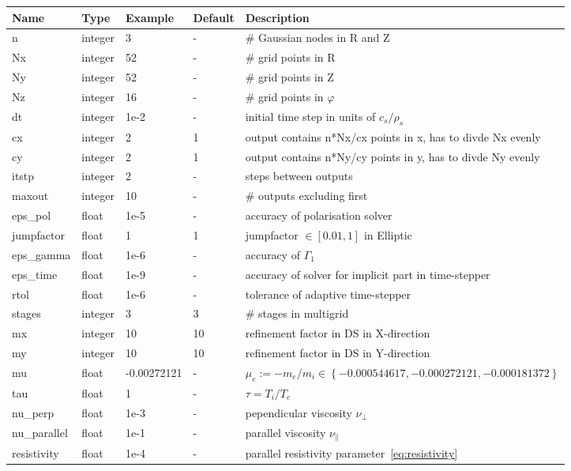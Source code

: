 \begin{longtable}{llll>{\RaggedRight}p{7cm}}
\toprule
\rowcolor{gray!50}\textbf{Name} &  \textbf{Type} & \textbf{Example} & \textbf{Default} & \textbf{Description}  \\ \midrule
n      & integer & 3 & - &\# Gaussian nodes in R and Z \\
Nx     & integer &52& - &\# grid points in R \\
Ny     & integer &52& - &\# grid points in Z \\
Nz     & integer &16& - &\# grid points in $\varphi$ \\
dt     & integer &1e-2& - &initial time step in units of $c_s/\rho_s$ \\
cx & integer & 2 & 1 & output contains n*Nx/cx points in x,
    has to divde Nx evenly\\
cy & integer & 2 & 1 & output contains n*Ny/cy points in y,
    has to divde Ny evenly\\
itstp       & integer & 2  & - & steps between outputs \\
maxout      & integer & 10 & - & \# outputs excluding first \\
eps\_pol    & float & 1e-5  & - &  accuracy of polarisation solver \\
jumpfactor  & float & 1 & 1 &   jumpfactor $\in \left[0.01,1\right]$ in Elliptic\\
eps\_gamma  & float & 1e-6  & - & accuracy of $\Gamma_1$  \\
eps\_time   & float & 1e-9  & - & accuracy of solver for implicit part in time-stepper \\
rtol  & float &1e-6   & - &tolerance of adaptive time-stepper \\
stages      & integer & 3 & 3 & \# stages in multigrid  \\
mx     & integer & 10 & 10 & refinement factor in DS in X-direction\\
my     & integer & 10 & 10 & refinement factor in DS in Y-direction\\
mu         & float & -0.00272121& - & $\mu_e :=-m_e/m_i \in \left\{ -0.000544617, -0.000272121, -0.000181372 \right\}$\\
tau        & float &1      & - & $\tau = T_i/T_e$  \\
nu\_perp   & float &1e-3   & - & pependicular viscosity $\nu_\perp$ \\
nu\_parallel & float &1e-1 & - & parallel viscosity $\nu_\parallel$ \\
resistivity & float &1e-4  & - & parallel resistivity parameter~\eqref{eq:resistivity}\\

\end{longtable}
